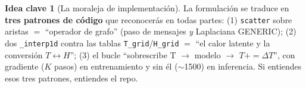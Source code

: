 \documentclass[11pt]{article}
\theoremstyle{definition}
\newtheorem{idea}{Idea clave}[section]
\theoremstyle{plain}
\begin{document}
\bigskip
\begin{idea}[La moraleja de implementación]
La formulación se traduce en \textbf{tres patrones de código} que reconocerás en
todas partes: (1) \texttt{scatter} sobre aristas $=$ ``operador de grafo'' (paso de
mensajes \emph{y} Laplaciana GENERIC); (2) dos \texttt{\_interp1d} contra las tablas
\texttt{T\_grid}/\texttt{H\_grid} $=$ ``el calor latente y la conversión
$T\leftrightarrow H$''; (3) el bucle ``sobrescribe T $\rightarrow$ modelo
$\rightarrow$ $T{+}{=}\Delta T$'', con gradiente ($K$ pasos) en entrenamiento y sin
él ($\sim$1500) en inferencia. Si entiendes esos tres patrones, entiendes el repo.
\end{idea}
\end{document}
